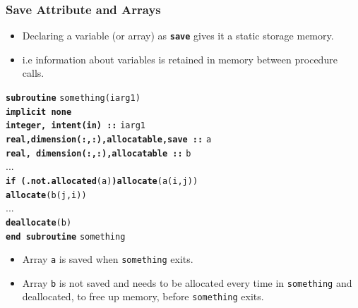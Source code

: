 \documentclass[slidestop,mathserif,compress,xcolor=svgnames]{beamer}
\newcommand{\bftt}[1]{\textbf{\texttt{#1}}}
\newenvironment{bblock}[0]
{
\begin{beamerboxesrounded}[upper=uppercol1,lower=lowercol1,shadow=true]}
{\end{beamerboxesrounded}}
\begin{document}
\begin{frame}
  \frametitle{\small Save Attribute and Arrays}
  \begin{itemize}
    \item Declaring a variable (or array) as \textbf{\texttt{save}} gives it a static storage memory.
    \item i.e information about variables is retained in memory between procedure calls.
  \end{itemize}
  \begin{bblock}{}
    \begin{tabbing}
      \bftt{su}\=\bftt{broutine} \texttt{something(iarg1)} \\
      \> \bftt{im}\=\bftt{plicit none} \\
      \>\>\bftt{integer, intent(in) ::} \texttt{iarg1} \\
      \>\>\bftt{real,dimension(:,:),allocatable,save ::} \texttt{a} \\
      \>\>\bftt{real, dimension(:,:),allocatable ::} \texttt{b} \\
      \>\> ... \\
      \>\> \bftt{if (.not.allocated}\texttt{(a)}\bftt{)allocate}\texttt{(a(i,j))} \\
      \>\> \bftt{allocate}\texttt{(b(j,i))} \\
      \>\> ... \\
      \>\> \bftt{deallocate}\texttt{(b)} \\
      \bftt{end subroutine} \texttt{something}
    \end{tabbing}
  \end{bblock}
  \begin{itemize}
    \item Array {\texttt{a}} is saved when {\texttt{something}} exits.
    \item Array {\texttt{b}} is not saved and needs to be allocated every time in {\texttt{something}}  and deallocated, to free up memory, before {\texttt{something}} exits.
  \end{itemize}
\end{frame}
\end{document}
